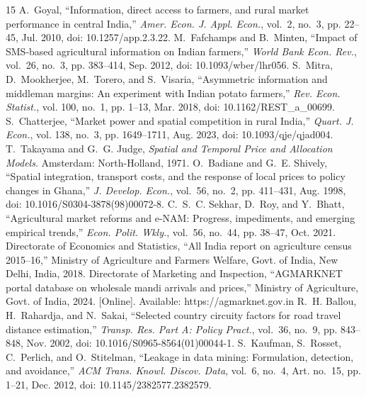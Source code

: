 \documentclass[journal]{IEEEtran}
\begin{document}
\begin{thebibliography}{15}
 A.~Goyal, ``Information, direct access to farmers, and rural market performance in central India,'' \emph{Amer. Econ. J. Appl. Econ.}, vol.~2, no.~3, pp. 22--45, Jul. 2010, doi: 10.1257/app.2.3.22.
 M.~Fafchamps and B.~Minten, ``Impact of SMS-based agricultural information on Indian farmers,'' \emph{World Bank Econ. Rev.}, vol.~26, no.~3, pp. 383--414, Sep. 2012, doi: 10.1093/wber/lhr056.
 S.~Mitra, D.~Mookherjee, M.~Torero, and S.~Visaria, ``Asymmetric information and middleman margins: An experiment with Indian potato farmers,'' \emph{Rev. Econ. Statist.}, vol. 100, no.~1, pp. 1--13, Mar. 2018, doi: 10.1162/REST\_a\_00699.
 S.~Chatterjee, ``Market power and spatial competition in rural India,'' \emph{Quart. J. Econ.}, vol. 138, no.~3, pp. 1649--1711, Aug. 2023, doi: 10.1093/qje/qjad004.
 T.~Takayama and G.~G. Judge, \emph{Spatial and Temporal Price and Allocation Models}. Amsterdam: North-Holland, 1971.
 O.~Badiane and G.~E. Shively, ``Spatial integration, transport costs, and the response of local prices to policy changes in Ghana,'' \emph{J. Develop. Econ.}, vol.~56, no.~2, pp. 411--431, Aug. 1998, doi: 10.1016/S0304-3878(98)00072-8.
 C.~S.~C. Sekhar, D.~Roy, and Y.~Bhatt, ``Agricultural market reforms and e-NAM: Progress, impediments, and emerging empirical trends,'' \emph{Econ. Polit. Wkly.}, vol.~56, no.~44, pp. 38--47, Oct. 2021.
 Directorate of Economics and Statistics, ``All India report on agriculture census 2015--16,'' Ministry of Agriculture and Farmers Welfare, Govt. of India, New Delhi, India, 2018.
 Directorate of Marketing and Inspection, ``AGMARKNET portal database on wholesale mandi arrivals and prices,'' Ministry of Agriculture, Govt. of India, 2024. [Online]. Available: https://agmarknet.gov.in
 R.~H. Ballou, H.~Rahardja, and N.~Sakai, ``Selected country circuity factors for road travel distance estimation,'' \emph{Transp. Res. Part A: Policy Pract.}, vol.~36, no.~9, pp. 843--848, Nov. 2002, doi: 10.1016/S0965-8564(01)00044-1.
 S.~Kaufman, S.~Rosset, C.~Perlich, and O.~Stitelman, ``Leakage in data mining: Formulation, detection, and avoidance,'' \emph{ACM Trans. Knowl. Discov. Data}, vol.~6, no.~4, Art. no.~15, pp. 1--21, Dec. 2012, doi: 10.1145/2382577.2382579.

\end{thebibliography}
\end{document}
